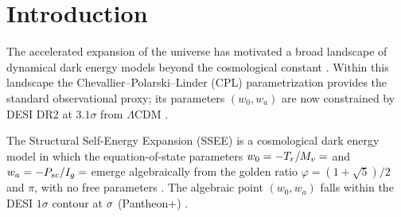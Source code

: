 \documentclass[12pt,a4paper]{article}
\begin{document}
\clearpage
{\small\tableofcontents}
\clearpage

\section{Introduction}
\label{sec:intro}

The accelerated expansion of the universe
\citep{Perlmutter1999,Riess1998} has motivated a broad landscape of
dynamical dark energy models beyond the cosmological constant
\citep{Copeland2006,Weinberg2013review,Clifton2012,Joyce2015}.
Within this landscape the Chevallier--Polarski--Linder (CPL)
parametrization \citep{ChevallierPolarski2001,Linder2003} provides the
standard observational proxy; its parameters $(w_0,w_a)$ are now
constrained by DESI DR2 at $3.1\sigma$ from $\Lambda$CDM
\citep{desidr2_2025}.

The Structural Self-Energy Expansion (SSEE) is a cosmological dark
energy model in which the equation-of-state parameters
$w_0 = -T_r/M_v = \val{W0_d6}$ and $w_a = -P_{sc}/I_g = \val{WA_d6}$
emerge algebraically from the golden ratio $\varphi = (1+\sqrt{5})/2$ and
$\pi$, with no free parameters \citep{ssee_paper1,ssee_paper2}.
The algebraic point $(w_0,w_a)$ falls within
the DESI $1\sigma$ contour at $\val{p2_w0wa_ssee_ec26}\sigma$ (Pantheon+) \citep{ssee_paper2}.
\end{document}
